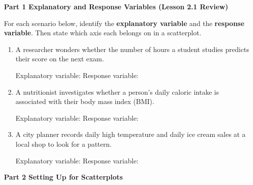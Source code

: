 \documentclass[10pt]{article}
\begin{document}
\namedateperiod

\vspace{0.3in}

{\large\bfseries\color{navy} Part 1 \quad Explanatory and Response Variables (Lesson 2.1 Review)}

\vspace{0.12in}

\noindent For each scenario below, identify the \textbf{explanatory variable} and the
\textbf{response variable}. Then state which axis each belongs on in a scatterplot.

\vspace{0.1in}

\begin{enumerate}[leftmargin=1.6em, itemsep=0.22in]

  \item A researcher wonders whether the number of hours a student studies predicts their
        score on the next exam.

        \vspace{8pt}
        Explanatory variable: \blank{5.5cm} \quad Response variable: \blank{5.5cm}

  \item A nutritionist investigates whether a person's daily caloric intake is associated
        with their body mass index (BMI).

        \vspace{8pt}
        Explanatory variable: \blank{5.5cm} \quad Response variable: \blank{5.5cm}

  \item A city planner records daily high temperature and daily ice cream sales at a local
        shop to look for a pattern.

        \vspace{8pt}
        Explanatory variable: \blank{5.5cm} \quad Response variable: \blank{5.5cm}

\end{enumerate}

\vspace{0.28in}

{\large\bfseries\color{navy} Part 2 \quad Setting Up for Scatterplots}

\vspace{0.12in}
\end{document}
